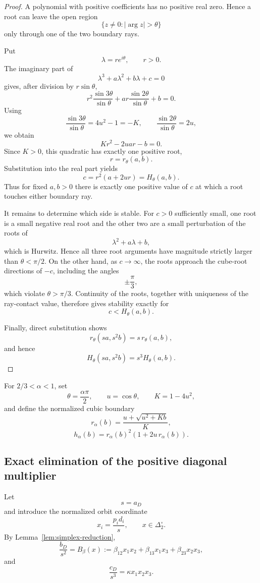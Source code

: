 \begin{proof}
A polynomial with positive coefficients has no positive real zero. Hence a root can leave the open region
\[
\{z\neq0:|\arg z|>\theta\}
\]
only through one of the two boundary rays.

Put
\[
\lambda=re^{i\theta},
\qquad r>0.
\]
The imaginary part of
\[
\lambda^3+a\lambda^2+b\lambda+c=0
\]
gives, after division by \(r\sin\theta\),
\[
r^2\frac{\sin3\theta}{\sin\theta}
+
ar\frac{\sin2\theta}{\sin\theta}
+b=0.
\]
Using
\[
\frac{\sin3\theta}{\sin\theta}
=
4u^2-1=-K,
\qquad
\frac{\sin2\theta}{\sin\theta}=2u,
\]
we obtain
\[
Kr^2-2uar-b=0.
\]
Since \(K>0\), this quadratic has exactly one positive root,
\[
r=r_\theta(a,b).
\]
Substitution into the real part yields
\[
c=r^2(a+2ur)=H_\theta(a,b).
\]
Thus for fixed \(a,b>0\) there is exactly one positive value of \(c\) at which a root touches either boundary ray.

It remains to determine which side is stable. For \(c>0\) sufficiently small, one root is a small negative real root and the other two are a small perturbation of the roots of
\[
\lambda^2+a\lambda+b,
\]
which is Hurwitz. Hence all three root arguments have magnitude strictly larger than \(\theta<\pi/2\). On the other hand, as \(c\to\infty\), the roots approach the cube-root directions of \(-c\), including the angles
\[
\pm\frac{\pi}{3},
\]
which violate \(\theta>\pi/3\). Continuity of the roots, together with uniqueness of the ray-contact value, therefore gives stability exactly for
\[
c<H_\theta(a,b).
\]

Finally, direct substitution shows
\[
r_\theta(sa,s^2b)=s\,r_\theta(a,b),
\]
and hence
\[
H_\theta(sa,s^2b)=s^3H_\theta(a,b).
\]
\end{proof}

For \(2/3<\alpha<1\), set
\[
\theta=\frac{\alpha\pi}{2},
\qquad
u=\cos\theta,
\qquad
K=1-4u^2,
\]
and define the normalized cubic boundary
\[
r_\alpha(b)
=
\frac{u+\sqrt{u^2+Kb}}{K},
\]
\[
h_\alpha(b)
=
r_\alpha(b)^2
\left(
1+2u\,r_\alpha(b)
\right).
\]

\subsection{Exact elimination of the positive diagonal multiplier}

Let
\[
s=a_D
\]
and introduce the normalized orbit coordinate
\[
x_i=\frac{p_id_i}{s},
\qquad
x\in\Delta_2^\circ.
\]
By Lemma~\ref{lem:simplex-reduction},
\[
\frac{b_D}{s^2}
=
B_\beta(x)
:=
\beta_{12}x_1x_2
+
\beta_{13}x_1x_3
+
\beta_{23}x_2x_3,
\]
and
\[
\frac{c_D}{s^3}
=
\kappa x_1x_2x_3.
\]

